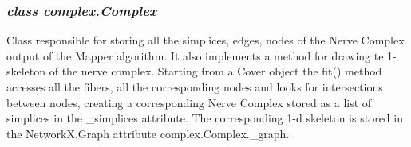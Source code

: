 \subsubsection{\textit{class complex.Complex}}
Class responsible for storing all the simplices, edges, nodes of the Nerve Complex output of the Mapper algorithm. It also implements a method for drawing te 1-skeleton of the nerve complex. Starting from a Cover object the fit() method accesses all the fibers, all the corresponding nodes and looks for intersections between nodes, creating a corresponding Nerve Complex stored as a list of simplices in the \_simplices attribute. The corresponding 1-d skeleton is stored in the NetworkX.Graph attribute complex.Complex.\_graph. 

